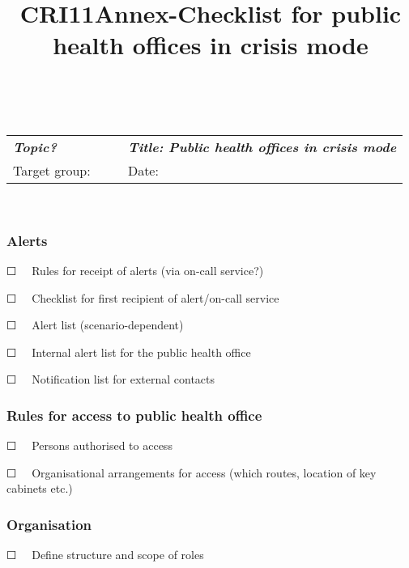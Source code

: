 \documentclass{article}
\begin{document}
\title{CRI11Annex-Checklist for public health offices in crisis mode}

\maketitle


 


\begin{tabu} to \textwidth { |X|X|X| }
\hline



\emph{\textbf{Topic?}}        &  & \emph{\textbf{Title: Public health offices in crisis mode}}
 \\


Target group:  &  & Date:
 \\
\hline

\end{tabu}

                    


\subsubsection{Alerts}\label{H1727143}



☐   Rules for receipt of alerts (via on-call service?)


☐   Checklist for first recipient of alert/on-call service


☐   Alert list (scenario-dependent)


☐   Internal alert list for the public health office


☐   Notification list for external contacts 


\subsubsection{Rules for access to public health office}\label{H368347}



☐   Persons authorised to access


☐   Organisational arrangements for access (which routes, location of key cabinets etc.)


\subsubsection{Organisation}\label{H6256762}



☐   Define structure and scope of roles
\end{document}
